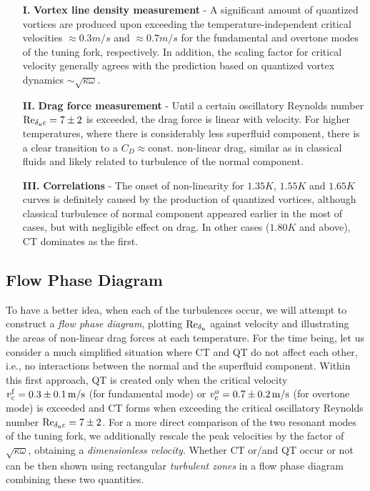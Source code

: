 \begin{itemize}
	\item[\textbf{I.}] \textbf{Vortex line density measurement} - A significant amount of quantized vortices are produced upon exceeding the temperature-independent critical velocities $ \approx 0.3 \unit{m/s} $ and $ \approx 0.7 \unit{m/s} $ for the fundamental and overtone modes of the tuning fork, respectively. In addition, the scaling factor for critical velocity generally agrees with the prediction based on quantized vortex dynamics $ \sim \sqrt{\kappa \omega} $.
	
	\item[\textbf{II.}] \textbf{Drag force measurement} - Until a certain oscillatory Reynolds number $ \text{Re}_{\delta_{\mathrm{n}}c}=7\pm 2 $ is exceeded, the drag force is linear with velocity. For higher temperatures, where there is considerably less superfluid component, there is a clear transition to a $ C_D \approx \text{const.} $ non-linear drag, similar as in classical fluids and likely related to turbulence of the normal component. 
	
	\item[\textbf{III.}] \textbf{Correlations} - The onset of non-linearity for $ 1.35\unit{K} $, $ 1.55\unit{K} $ and $ 1.65\unit{K} $ curves is definitely caused by the production of quantized vortices, although classical turbulence of normal component appeared earlier in the most of cases, but with negligible effect on drag. In other cases ($ 1.80 \unit{K}$ and above), CT dominates as the first.
\end{itemize}


\subsection*{Flow Phase Diagram}

To have a better idea, when each of the turbulences occur, we will attempt to construct a \textit{flow phase diagram}, plotting $ \text{Re}_{\delta_{\mathrm{n}}} $ against velocity and illustrating the areas of non-linear drag forces at each temperature. For the time being, let us consider a much simplified situation where CT and QT do not affect each other, i.e., no interactions between the normal and the superfluid component. Within this first approach, QT is created only  when the critical velocity $ v_{\mathrm{c}}^{\mathrm{{f}}} = 0.3 \pm 0.1 \,\mathrm{m/s}$ (for fundamental mode) or $ v_{\mathrm{c}}^{\mathrm{{o}}} = 0.7 \pm 0.2 \,\mathrm{m/s}$ (for overtone mode) is exceeded and CT forms when exceeding the critical oscillatory Reynolds number $ \text{Re}_{\delta_{\mathrm{n}}c}=7\pm 2 $. For a more direct comparison of the two resonant modes of the tuning fork, we additionally rescale the peak velocities by the factor of $\sqrt{\kappa \omega}$, obtaining a \textit{dimensionless velocity}. Whether CT or/and QT occur or not can be then shown using rectangular \textit{turbulent zones} in a flow phase diagram combining these two quantities.

